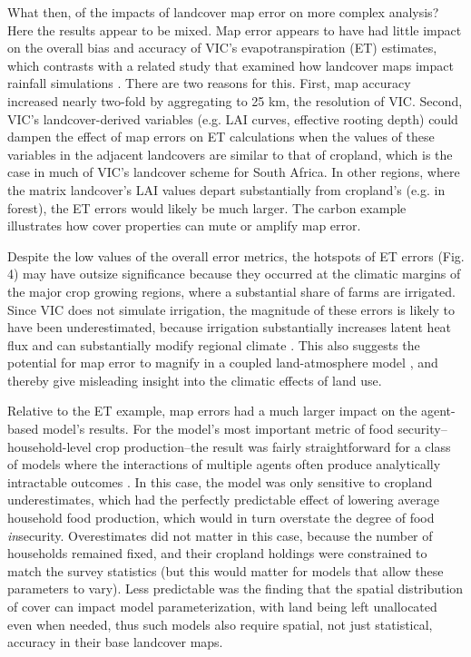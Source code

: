 \documentclass[a4paper]{article}
\begin{document}
What then, of the impacts of landcover map error on more complex analysis?  Here the results appear to be mixed. Map error appears to have had little impact on the overall bias and accuracy of VIC's evapotranspiration (ET) estimates, which contrasts with a related study that examined how landcover maps impact rainfall simulations \citep{ge_impacts_2007}. There are two reasons for this. First, map accuracy increased nearly two-fold by aggregating to 25 km, the resolution of VIC. Second, VIC's landcover-derived variables (e.g. LAI curves, effective rooting depth) could dampen the effect of map errors on ET calculations when the values of these variables in the adjacent landcovers are similar to that of cropland, which is the case in much of VIC's landcover scheme for South Africa. In other regions, where the matrix landcover's LAI values depart substantially from cropland's (e.g. in forest), the ET errors would likely be much larger. The carbon example illustrates how cover properties can mute or amplify map error.  

Despite the low values of the overall error metrics, the hotspots of ET errors (Fig. 4) may have outsize significance because they occurred at the climatic margins of the major crop growing regions, where a substantial share of farms are irrigated. Since VIC does not simulate irrigation, the magnitude of these errors is likely to have been underestimated, because irrigation substantially increases latent heat flux and can substantially modify regional climate \citep{sacks_effects_2008,mueller_cooling_2015}. This also suggests the potential for map error to magnify in a coupled land-atmosphere model \citep[which could explain the difference between this result and that of][]{ge_impacts_2007}, and thereby give misleading insight into the climatic effects of land use.     

Relative to the ET example, map errors had a much larger impact on the agent-based model's results. For the model's most important metric of food security--household-level crop production--the result was fairly straightforward for a class of models where the interactions of multiple agents often produce analytically intractable outcomes \citep{janssen_empirically_2006}. In this case, the model was only sensitive to cropland underestimates, which had the perfectly predictable effect of lowering average household food production, which would in turn overstate the degree of food \emph{in}security. Overestimates did not matter in this case, because the number of households remained fixed, and their cropland holdings were constrained to match the survey statistics (but this would matter for models that allow these parameters to vary). Less predictable was the finding that the spatial distribution of cover can impact model parameterization, with land being left unallocated even when needed, thus such models also require spatial, not just statistical, accuracy in their base landcover maps.  
\end{document}

